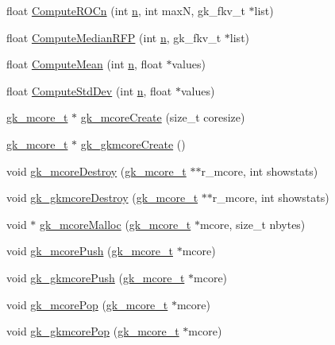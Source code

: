 \begin{DoxyCompactItemize}
\item 
float \hyperlink{a00077_a8df1d3501976b7a3168df9f80ccf0cf6}{Compute\+R\+O\+Cn} (int \hyperlink{a00623_a781a04ab095280f838ff3eb0e51312e0}{n}, int maxN, gk\+\_\+fkv\+\_\+t $\ast$list)
\item 
float \hyperlink{a00077_a0712d76a8c05b906a790c20887ad1874}{Compute\+Median\+R\+FP} (int \hyperlink{a00623_a781a04ab095280f838ff3eb0e51312e0}{n}, gk\+\_\+fkv\+\_\+t $\ast$list)
\item 
float \hyperlink{a00077_aeeed505299d523a6061b0c1966d88427}{Compute\+Mean} (int \hyperlink{a00623_a781a04ab095280f838ff3eb0e51312e0}{n}, float $\ast$values)
\item 
float \hyperlink{a00077_a59fad97dedb62ff1ae0722de46318412}{Compute\+Std\+Dev} (int \hyperlink{a00623_a781a04ab095280f838ff3eb0e51312e0}{n}, float $\ast$values)
\item 
\hyperlink{a00682}{gk\+\_\+mcore\+\_\+t} $\ast$ \hyperlink{a00077_aba5df0f5155d88c0331fd6c996b483ed}{gk\+\_\+mcore\+Create} (size\+\_\+t coresize)
\item 
\hyperlink{a00682}{gk\+\_\+mcore\+\_\+t} $\ast$ \hyperlink{a00077_afe0ba6f8d611bfebcbe80468c86af884}{gk\+\_\+gkmcore\+Create} ()
\item 
void \hyperlink{a00077_acecd8b70b01b2b365695f034967c9536}{gk\+\_\+mcore\+Destroy} (\hyperlink{a00682}{gk\+\_\+mcore\+\_\+t} $\ast$$\ast$r\+\_\+mcore, int showstats)
\item 
void \hyperlink{a00077_af01302d6237a06da732bba561ed53538}{gk\+\_\+gkmcore\+Destroy} (\hyperlink{a00682}{gk\+\_\+mcore\+\_\+t} $\ast$$\ast$r\+\_\+mcore, int showstats)
\item 
void $\ast$ \hyperlink{a00077_ab7a380f0696a0d5421653fad336bcae0}{gk\+\_\+mcore\+Malloc} (\hyperlink{a00682}{gk\+\_\+mcore\+\_\+t} $\ast$mcore, size\+\_\+t nbytes)
\item 
void \hyperlink{a00077_a07579694837248c1f2908860edc643c0}{gk\+\_\+mcore\+Push} (\hyperlink{a00682}{gk\+\_\+mcore\+\_\+t} $\ast$mcore)
\item 
void \hyperlink{a00077_a7e52f5d61f36e5c6a9e6634d90dadf2d}{gk\+\_\+gkmcore\+Push} (\hyperlink{a00682}{gk\+\_\+mcore\+\_\+t} $\ast$mcore)
\item 
void \hyperlink{a00077_ac7b3189a2be11b6736dc4c27d3d30f3a}{gk\+\_\+mcore\+Pop} (\hyperlink{a00682}{gk\+\_\+mcore\+\_\+t} $\ast$mcore)
\item 
void \hyperlink{a00077_ad8c9738b8a6a34af2aa8f271fe14cfa9}{gk\+\_\+gkmcore\+Pop} (\hyperlink{a00682}{gk\+\_\+mcore\+\_\+t} $\ast$mcore)
\item 

\end{DoxyCompactItemize}
